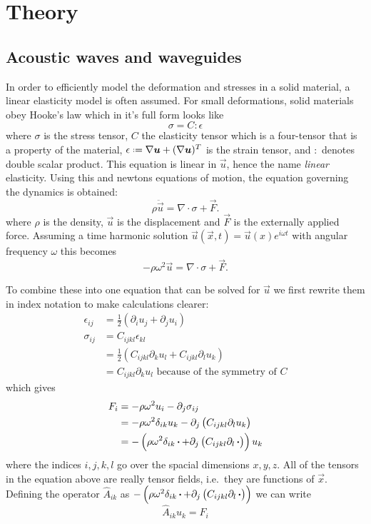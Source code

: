 \chapter{Theory}

\section{Acoustic waves and waveguides}

In order to efficiently model the deformation and stresses in a solid material,
a linear elasticity model is often assumed.
For small deformations, solid materials obey Hooke's law which in it's full form
looks like
\[
	\sigma = C : \epsilon
\]
where $\sigma$ is the stress tensor, $C$ the elasticity tensor which is a
four-tensor that is a property of the material,
$\epsilon \defeq \nabla \vec u + (\nabla \vec u)^T$
is the strain tensor, and $:$ denotes double scalar product.
This equation is linear in $\vec u$, hence the name \emph{linear} elasticity.
Using this and newtons equations of motion, the equation governing the dynamics
is obtained:
\[
	\rho \ddot{\vec{u}} = \nabla \cdot \sigma + \vec F.
\]
where $\rho$ is the density, $\vec{u}$ is the displacement and $\vec F$ is the
externally applied force.
Assuming a time harmonic solution
$\vec u(\vec x, t) = \vec u(x) e^{i \omega t}$
with angular frequency $\omega$ this becomes
\[
	-\rho \omega^2 \vec{u} = \nabla \cdot \sigma + \vec F.
\]

To combine these into one equation that can be solved for $\vec{u}$ we first
rewrite them in index notation to make calculations clearer:
\begin{align}
	\epsilon_{ij} &= \frac12(\partial_i u_j + \partial_j u_i)\\
	\sigma_{ij} &= C_{ijkl} \epsilon_{kl}\\
				&= \frac12\left(C_{ijkl} \partial_k u_l + C_{ijkl} \partial_l
				u_k\right)\\
				&= C_{ijkl} \partial_k u_l\text{ because of the symmetry of $C$}
\end{align}
which gives
\begin{align}
	F_{i} &= -\rho \omega^2 u_{i} - \partial_j \sigma_{ij}\\
		   &= -\rho \omega^2 \delta_{ik} u_{k} -
		   \partial_j \left(C_{ijkl} \partial_l u_k\right)\\
		   &= -\left(\rho \omega^2 \delta_{ik} \operatorname{\boldsymbol{\cdot}} + 
		   \partial_j \left(C_{ijkl} \partial_l \operatorname{\boldsymbol{\cdot}}\right)\right) u_k
\end{align}
where the indices $i,j,k,l$ go over the spacial dimensions $x,y,z$.
All of the tensors in the equation above are really tensor fields, i.e.\ they are
functions of $\vec{x}$.
Defining the operator $\hat A_{ik}$ as
$-\left(\rho \omega^2 \delta_{ik} \operatorname{\boldsymbol{\cdot}} + 
\partial_j \left(C_{ijkl} \partial_l \operatorname{\boldsymbol{\cdot}}\right)\right)$
we can write
\begin{equation}
	\hat A_{ik} u_k = F_i
\end{equation}

